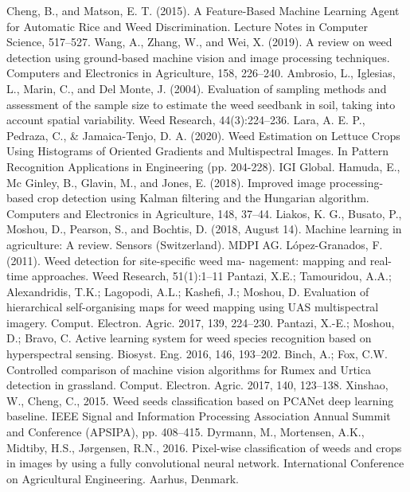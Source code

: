 \documentclass[journal,article,submit,moreauthors,pdftex]{Definitions/mdpi}
\begin{document}
\begin{thebibliography}{999}

 Cheng, B., and Matson, E. T. (2015). A Feature-Based Machine Learning Agent for Automatic Rice and Weed Discrimination. Lecture Notes in Computer Science, 517–527.
 Wang, A., Zhang, W., and Wei, X. (2019). A review on weed detection using ground-based machine vision and image processing techniques. Computers and Electronics in Agriculture, 158, 226–240.
 Ambrosio, L., Iglesias, L., Marin, C., and Del Monte, J. (2004). Evaluation of sampling methods and assessment of the sample size to estimate the weed seedbank in soil, taking into account spatial variability. Weed Research, 44(3):224–236.
 Lara, A. E. P., Pedraza, C., & Jamaica-Tenjo, D. A. (2020). Weed Estimation on Lettuce Crops Using Histograms of Oriented Gradients and Multispectral Images. In Pattern Recognition Applications in Engineering (pp. 204-228). IGI Global.
 Hamuda, E., Mc Ginley, B., Glavin, M., and Jones, E. (2018). Improved image processing-based crop detection using Kalman filtering and the Hungarian algorithm. Computers and Electronics in Agriculture, 148, 37–44.
 Liakos, K. G., Busato, P., Moshou, D., Pearson, S., and Bochtis, D. (2018, August 14). Machine learning in agriculture: A review. Sensors (Switzerland). MDPI AG.
 López-Granados, F. (2011). Weed detection for site-specific weed ma- nagement: mapping and real-time approaches. Weed Research, 51(1):1–11
 Pantazi, X.E.; Tamouridou, A.A.; Alexandridis, T.K.; Lagopodi, A.L.; Kashefi, J.; Moshou, D. Evaluation of hierarchical self-organising maps for weed mapping using UAS multispectral imagery. Comput. Electron. Agric. 2017, 139, 224–230.
 Pantazi, X.-E.; Moshou, D.; Bravo, C. Active learning system for weed species recognition based on hyperspectral sensing. Biosyst. Eng. 2016, 146, 193–202.
 Binch, A.; Fox, C.W. Controlled comparison of machine vision algorithms for Rumex and Urtica detection in grassland. Comput. Electron. Agric. 2017, 140, 123–138.
 Xinshao, W., Cheng, C., 2015. Weed seeds classification based on PCANet deep learning baseline. IEEE Signal and Information Processing Association Annual Summit and Conference (APSIPA), pp. 408–415.
 Dyrmann, M., Mortensen, A.K., Midtiby, H.S., Jørgensen, R.N., 2016. Pixel-wise
classification of weeds and crops in images by using a fully convolutional neural network. International Conference on Agricultural Engineering. Aarhus, Denmark.

\end{thebibliography}
\end{document}
